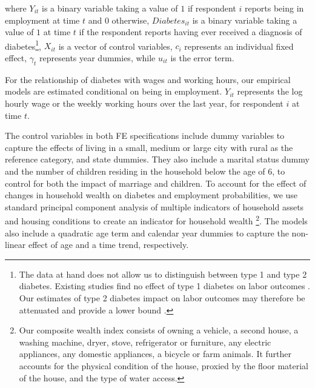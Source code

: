 \documentclass[12pt,english]{article}
\begin{document}
where $Y_{it}$ is a binary variable taking a value of $1$ if respondent $i$ reports being in employment at time $t$ and $0$ otherwise, $Diabetes_{it}$ is a binary variable taking a value of $1$ at time $t$ if the respondent reports having ever received a diagnosis of diabetes\footnote{The data at hand does not allow us to distinguish between type 1 and type 2 diabetes. Existing studies find no effect of type 1 diabetes on labor outcomes . Our estimates of type 2 diabetes impact on labor outcomes may therefore be attenuated and provide a lower bound \parencite{Minor2011,Minor2015}.}, $X_{it}$ is a vector of control variables, $c_{i}$ represents an individual fixed effect, $\gamma_{t}$ represents year dummies, while $u_{it}$ is the error term.

For the relationship of diabetes with wages and working hours, our empirical models are estimated conditional on being in employment. $Y_{it}$ represents the log hourly wage or the weekly working hours over the last year, for respondent $i$ at time $t$.

The control variables in both \ac{FE} specifications include dummy variables to capture the effects of living in a small, medium or large city with rural as the reference category, and state dummies. They also include a marital status dummy and the number of children residing in the household below the age of 6, to control for both the impact of marriage and children. To account for the effect of changes in household wealth on diabetes and employment probabilities, we use standard
principal component analysis of multiple indicators of household assets and housing conditions to create an indicator for household wealth \parencite{Filmer2001}\footnote{Our composite wealth index consists of owning a vehicle, a second house, a washing machine, dryer, stove, refrigerator or furniture, any electric appliances, any domestic appliances, a bicycle or farm animals. It further accounts for the physical condition of the house, proxied by the floor material of the house, and the type of water access.}. The models also include a quadratic age term and calendar year dummies to capture the non-linear effect of age and a time trend, respectively.
\end{document}
